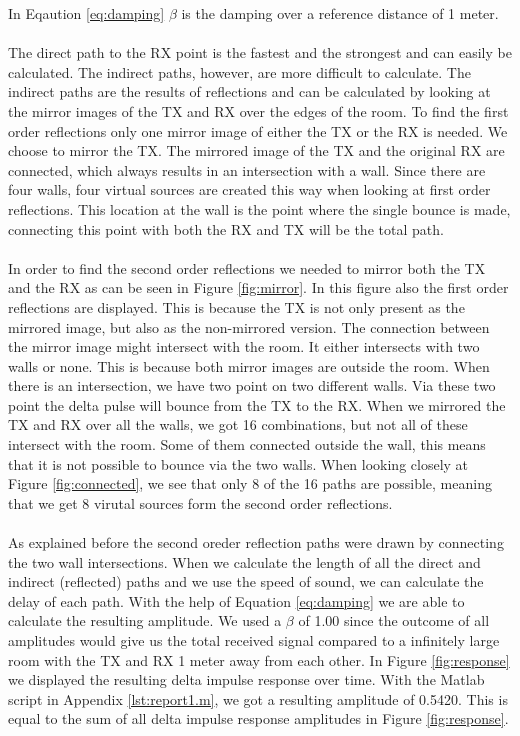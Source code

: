 \documentclass[final]{scrreprt} %
\begin{document}
In Eqaution \ref{eq:damping} $\beta$ is the damping over a reference distance of 1 meter. 
\\
\\
The direct path to the RX point is the fastest and the strongest and can easily be calculated.
The indirect paths, however, are more difficult to calculate.
The indirect paths are the results of reflections and can be calculated by looking at the mirror images of the TX and RX over the edges of the room. 
To find the first order reflections only one mirror image of either the TX or the RX is needed. 
We choose to mirror the TX.
The mirrored image of the TX and the original RX are connected, which always results in an intersection with a wall.
Since there are four walls, four virtual sources are created this way when looking at first order reflections.
This location at the wall is the point where the single bounce is made, connecting this point with both the RX and TX will be the total path.
\\ 
\\
In order to find the second order reflections we needed to mirror both the TX and the RX as can be seen in Figure \ref{fig:mirror}.
In this figure also the first order reflections are displayed. 
This is because the TX is not only present as the mirrored image, but also as the non-mirrored version. 
The connection between the mirror image might intersect with the room.
It either intersects with two walls or none. 
This is because both mirror images are outside the room.
When there is an intersection, we have two point on two different walls. 
Via these two point the delta pulse will bounce from the TX to the RX. 
When we mirrored the TX and RX over all the walls, we got 16 combinations, but not all of these intersect with the room. 
Some of them connected outside the wall, this means that it is not possible to bounce via the two walls. 
When looking closely at Figure \ref{fig:connected}, we see that only 8 of the 16 paths are possible, meaning that we get 8 virutal sources form the second order reflections. 
\\ 
\\
As explained before the second oreder reflection paths were drawn by connecting the two wall intersections. 
When we calculate the length of all the direct and indirect (reflected) paths and we use the speed of sound, we can calculate the delay of each path.
With the help of Equation \ref{eq:damping} we are able to calculate the resulting amplitude. 
We used a $\beta$ of 1.00 since the outcome of all amplitudes would give us the total received signal compared to a infinitely large room with the TX and RX 1 meter away from each other.
In Figure \ref{fig:response} we displayed the resulting delta impulse response over time. 
With the Matlab script in Appendix \ref{lst:report1.m}, we got a resulting amplitude of 0.5420. 
This is equal to the sum of all delta impulse response amplitudes in Figure \ref{fig:response}.
\end{document}
